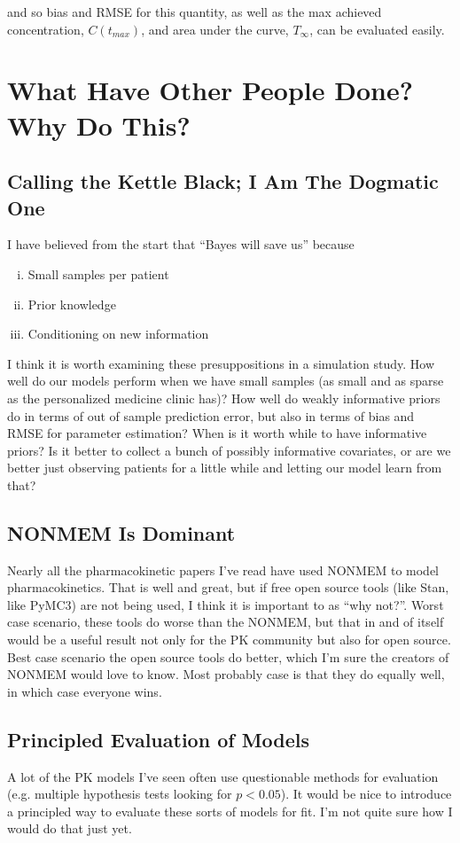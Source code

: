 \documentclass[12pt,a4paper]{book}
\begin{document}
\noindent and so bias and RMSE for this quantity, as well as the max achieved  concentration, $ C(t_{max}) $, and area under the curve, $ T_\infty $,  can be evaluated easily.


\section{What Have Other People Done?  Why Do This?}


\subsection{Calling the Kettle Black; I Am The Dogmatic One}
I have believed from the start that ``Bayes will save us'' because 

\begin{enumerate}[i)]
 \item Small samples per patient
 \item Prior knowledge
 \item Conditioning on new information
\end{enumerate}

I think it is worth examining these presuppositions in a simulation study.  How well do our models perform when we have small samples (as small and as sparse as the personalized medicine clinic has)?  How well do weakly informative priors do in terms of out of sample prediction error, but also in terms of bias and RMSE for parameter estimation? When is it worth while to have informative priors? Is it better to collect a bunch of possibly informative covariates, or are we better just observing patients for a little while and letting our model learn from that?

\subsection{NONMEM Is Dominant}

Nearly all the pharmacokinetic papers I've read have used NONMEM to model pharmacokinetics.  That is well and great, but if free open source tools (like Stan, like PyMC3) are not being used, I think it is important to as ``why not?''.  Worst case scenario, these tools do worse than the NONMEM, but that in and of itself would be a useful result not only for the PK community but also for open source.  Best case scenario the open source tools do better, which I'm sure the creators of NONMEM would love to know.  Most probably case is that they do equally well, in which case everyone wins.

\subsection{Principled Evaluation of Models}
 
 A lot of the PK models I've seen often use questionable methods for evaluation (e.g. multiple hypothesis tests looking for $ p<0.05 $). It would be nice to introduce a principled way to evaluate these sorts of models for fit.  I'm not quite sure how I would do that just yet.
\end{document}
